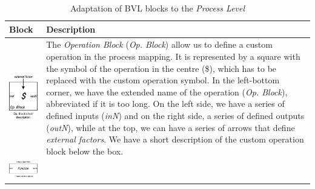 \begin{longtable}{|m{}|m{}|}
    \caption{Adaptation of BVL blocks to the \textit{Process Level}} \label{tab:c4-bvl_process} \\
    \hline
    \textbf{Block} & \textbf{Description} \\
    \hline
    \centering
    \includegraphics[width=0.5\linewidth]{chapters/4-MDC_model_application/image/bvl-operation.png}
    & 
    The \textit{Operation Block} (\textit{Op. Block}) allow us to define a custom operation in the process mapping. It is represented by a square with the symbol of the operation in the centre (\$), which has to be replaced with the custom operation symbol. In the left-bottom corner, we have the extended name of the operation (\textit{Op. Block}), abbreviated if it is too long. On the left side, we have a series of defined inputs (\textit{inN}) and on the right side, a series of defined outputs (\textit{outN}), while at the top, we can have a series of arrows that define \textit{external factors}. We have a short description of the custom operation block below the box.
    \\\hline
    \centering
    \includegraphics[width=0.75\linewidth]{chapters/4-MDC_model_application/image/bvl-function.png}

\end{longtable}
